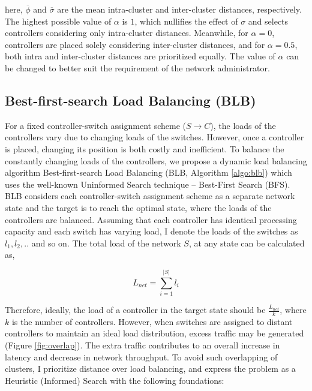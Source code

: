 \documentclass[journal]{IEEEtran}
\begin{document}
here, $\overline{\phi}$ and $\overline{\sigma}$ are the  mean intra-cluster and inter-cluster distances, respectively. The highest possible value of $\alpha$ is $1$, which nullifies the effect of $\sigma$ and selects controllers considering only intra-cluster distances. Meanwhile, for $\alpha = 0$, controllers are placed solely considering inter-cluster distances, and for $\alpha=0.5$, both intra and inter-cluster distances are prioritized equally. The value of $\alpha$ can be changed to better suit the requirement of the network administrator.

\subsection{Best-first-search Load Balancing (BLB)} \label{blb}

For a fixed controller-switch assignment scheme ($S\rightarrow C$), the loads of the controllers vary due to changing loads of the switches. However, once a controller is placed, changing its position is both costly and inefficient. To balance the constantly changing loads of the controllers, we propose a dynamic load balancing algorithm Best-first-search Load Balancing (BLB, Algorithm \ref{algo:blb}) which uses the well-known Uninformed Search technique -- Best-First Search (BFS). BLB considers each controller-switch assignment scheme as a separate network state and the target is to reach the optimal state, where the loads of the controllers are balanced. Assuming that each controller has identical processing capacity and each switch has varying load, I denote the loads of the switches as $l_1, l_2, . .$ and so on. The total load of the network $S$, at any state can be calculated as,

\begin{equation}
L_{net}=\sum_{i=1}^{|S|}l_i
\end{equation}

Therefore, ideally, the load of a controller in the target state should be $\frac{L_{net}}{k}$, where $k$ is the number of controllers. However, when switches are assigned to distant controllers to maintain an ideal load distribution, excess traffic may be generated (Figure \ref{fig:overlap}). The extra traffic contributes to an overall increase in latency and decrease in network throughput. To avoid such overlapping of clusters, I prioritize distance over load balancing, and express the problem as a Heuristic (Informed) Search with the following foundations:
\end{document}
